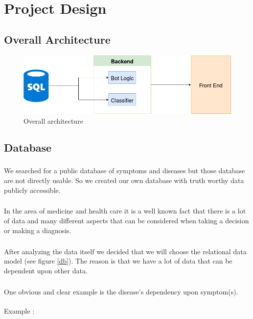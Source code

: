 \chapter{Project Design} 

\section{Overall Architecture}

\begin{figure}[H]
	\centering
	\includegraphics[width = \textwidth]{Architecture}
	\caption{Overall architecture}
	\label{archi}
\end{figure}

\section{Database}

\paragraph{}
We searched for a public database of symptoms and diseases but those database are not directly usable. So we created our own database with truth worthy data publicly accessible.
\paragraph{}
In the area of medicine and health care it is a well known fact that there is a lot of data and many different aspects that can be considered when taking a decision or making a diagnosis. 
\paragraph{}
After analyzing the data itself we decided that we will choose the relational data model (see figure \ref{db}).
The reason is that we have a lot of data that can be dependent upon other data.
\paragraph{}
One obvious and clear example is the disease’s dependency upon symptom(s).\\
\\
Example :
